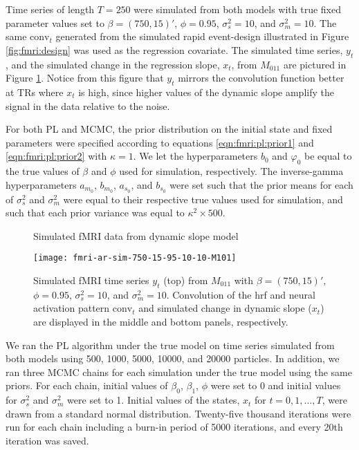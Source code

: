 Time series of length $T = 250$ were simulated from both models with true fixed parameter values set to $\beta = (750,15)'$, $\phi = 0.95$, $\sigma^2_s = 10$, and $\sigma^2_m = 10$. The same $\mbox{conv}_t$ generated from the simulated rapid event-design illustrated in Figure \ref{fig:fmri:design} was used as the regression covariate. The simulated time series, $y_t$, and the simulated change in the regression slope, $x_t$, from $M_{011}$ are pictured in Figure \ref{fig:fmri:sim}. Notice from this figure that $y_t$ mirrors the convolution function better at TRs where $x_t$ is high, since higher values of the dynamic slope amplify the signal in the data relative to the noise.

For both PL and MCMC, the prior distribution on the initial state and fixed parameters were specified according to equations \eqref{eqn:fmri:pl:prior1} and \eqref{eqn:fmri:pl:prior2} with $\kappa = 1$. We let the hyperparameters $b_0$ and $\varphi_0$ be equal to the true values of $\beta$ and $\phi$ used for simulation, respectively. The inverse-gamma hyperparameters $a_{m_0}$, $b_{m_0}$, $a_{s_0}$, and $b_{s_0}$ were set such that the prior means for each of $\sigma^2_s$ and $\sigma^2_m$ were equal to their respective true values used for simulation, and such that each prior variance was equal to $\kappa^2\times500$.

\begin{figure}
\ssp
\centering
\caption{Simulated fMRI data from dynamic slope model} \label{fig:fmri:sim}
\texttt{[image: fmri-ar-sim-750-15-95-10-10-M101]}
\caption*{Simulated fMRI time series $y_t$ (top) from $M_{011}$ with $\beta = (750,15)'$, $\phi = 0.95$, $\sigma^2_s = 10$, and $\sigma^2_m = 10$. Convolution of the hrf and neural activation pattern $\mbox{conv}_t$ and simulated change in dynamic slope ($x_t$) are displayed in the middle and bottom panels, respectively.}
\end{figure}

We ran the PL algorithm under the true model on time series simulated from both models using 500, 1000, 5000, 10000, and 20000 particles. In addition, we ran three MCMC chains for each simulation under the true model using the same priors. For each chain, initial values of $\beta_0$, $\beta_1$, $\phi$ were set to 0 and initial values for $\sigma^2_s$ and $\sigma^2_m$ were set to 1. Initial values of the states, $x_t$ for $t = 0,1,\ldots,T$, were drawn from a standard normal distribution. Twenty-five thousand iterations were run for each chain including a burn-in period of 5000 iterations, and every 20th iteration was saved.


